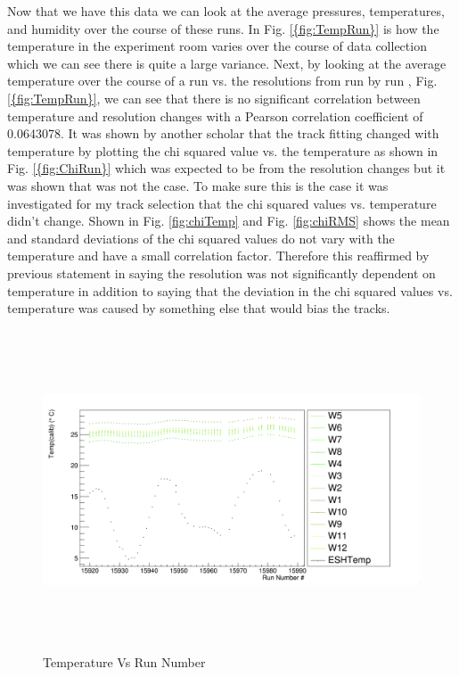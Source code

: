 \documentclass[./Thesis]{subfiles}
\begin{document}
	
	 Now that we have this data we can look at the average pressures, temperatures, and humidity over the course of these runs. In Fig. \ref{{fig:TempRun}} is how the temperature in the experiment room varies over the course of data collection which we can see there is quite a large variance. Next, by looking at the average temperature over the course of a run vs. the resolutions from run by run , Fig. \ref{{fig:TempRun}}, we can see that there is no significant correlation between temperature and resolution changes with a Pearson correlation coefficient of 0.0643078. It was shown by another scholar that the track fitting changed with temperature by plotting the chi squared value vs. the temperature as shown in Fig. \ref{{fig:ChiRun}} which was expected to be from the resolution changes but it was shown that was not the case. To make sure this is the case it was investigated for my track selection that the chi squared values vs. temperature didn't change. Shown in Fig. \ref{fig:chiTemp} and Fig.  \ref{fig:chiRMS} shows the mean and standard deviations of the chi squared values do not vary with the temperature and have a small correlation factor. Therefore this reaffirmed by previous statement in saying the resolution was not significantly dependent on temperature in addition to saying that the deviation in the chi squared values vs. temperature was caused by something else that would bias the tracks.
	
\begin{figure}
	\centerline{\includegraphics[height=95mm]{TempVsRunNumber.png}}
	\caption[Temperature Vs Run Number]{ Temperature Vs Run Number}
	\label{fig:TempRun}
\end{figure} 
\end{document}
